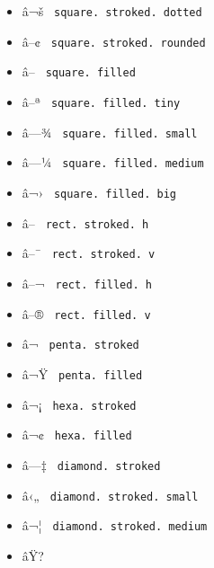 \begin{itemize}
\item
  \label{symbol-square.stroked.dotted}{{ â¬š }
  \texttt{\ square.\ stroked.\ dotted\ }}
\item
  \label{symbol-square.stroked.rounded}{{ â--¢ }
  \texttt{\ square.\ stroked.\ rounded\ }}
\item
  \label{symbol-square.filled}{{ â-- }
  \texttt{\ square.\ filled\ }}
\item
  \label{symbol-square.filled.tiny}{{ â--ª }
  \texttt{\ square.\ filled.\ tiny\ }}
\item
  \label{symbol-square.filled.small}{{ â---¾ }
  \texttt{\ square.\ filled.\ small\ }}
\item
  \label{symbol-square.filled.medium}{{ â---¼ }
  \texttt{\ square.\ filled.\ medium\ }}
\item
  \label{symbol-square.filled.big}{{ â¬› }
  \texttt{\ square.\ filled.\ big\ }}
\item
  \label{symbol-rect.stroked.h}{{ â--­ }
  \texttt{\ rect.\ stroked.\ h\ }}
\item
  \label{symbol-rect.stroked.v}{{ â--¯ }
  \texttt{\ rect.\ stroked.\ v\ }}
\item
  \label{symbol-rect.filled.h}{{ â--¬ }
  \texttt{\ rect.\ filled.\ h\ }}
\item
  \label{symbol-rect.filled.v}{{ â--® }
  \texttt{\ rect.\ filled.\ v\ }}
\item
  \label{symbol-penta.stroked}{{ â¬ }
  \texttt{\ penta.\ stroked\ }}
\item
  \label{symbol-penta.filled}{{ â¬Ÿ }
  \texttt{\ penta.\ filled\ }}
\item
  \label{symbol-hexa.stroked}{{ â¬¡ }
  \texttt{\ hexa.\ stroked\ }}
\item
  \label{symbol-hexa.filled}{{ â¬¢ }
  \texttt{\ hexa.\ filled\ }}
\item
  \label{symbol-diamond.stroked}{{ â---‡ }
  \texttt{\ diamond.\ stroked\ }}
\item
  \label{symbol-diamond.stroked.small}{{ â‹„ }
  \texttt{\ diamond.\ stroked.\ small\ }}
\item
  \label{symbol-diamond.stroked.medium}{{ â¬¦ }
  \texttt{\ diamond.\ stroked.\ medium\ }}
\item
  \label{symbol-diamond.stroked.dot}{{ âŸ? }
}
\end{itemize}
